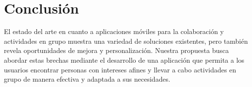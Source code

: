 \section{Conclusión}
El estado del arte en cuanto a aplicaciones móviles para la colaboración y actividades en grupo muestra una variedad de soluciones existentes, pero también revela oportunidades de mejora y personalización. Nuestra propuesta busca abordar estas brechas mediante el desarrollo de una aplicación que permita a los usuarios encontrar personas con intereses afines y llevar a cabo actividades en grupo de manera efectiva y adaptada a sus necesidades.
